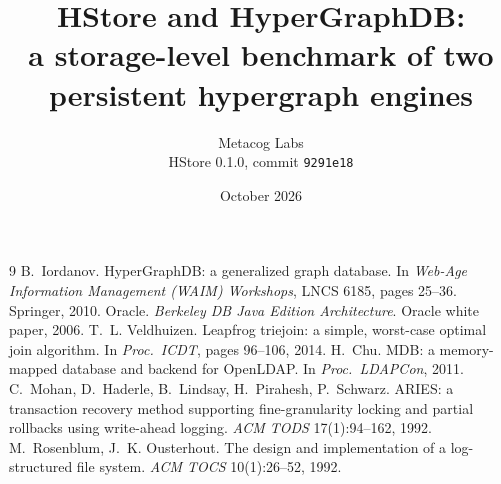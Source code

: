 \documentclass[10pt,twocolumn]{article}
\title{\Large\bfseries HStore and HyperGraphDB:\\ a storage-level benchmark of two persistent hypergraph engines}
\author{Metacog Labs\\[2pt]\normalsize HStore 0.1.0, commit \texttt{9291e18}}
\date{October 2026}
\begin{document}
\maketitle

\begin{abstract}

\end{abstract}










\begin{thebibliography}{9}\small
{} B.~Iordanov. HyperGraphDB: a generalized graph database. In \emph{Web-Age Information Management (WAIM) Workshops}, LNCS 6185, pages 25--36. Springer, 2010.
 Oracle. \emph{Berkeley DB Java Edition Architecture}. Oracle white paper, 2006.
 T.~L. Veldhuizen. Leapfrog triejoin: a simple, worst-case optimal join algorithm. In \emph{Proc.\ ICDT}, pages 96--106, 2014.
 H.~Chu. MDB: a memory-mapped database and backend for OpenLDAP. In \emph{Proc.\ LDAPCon}, 2011.
 C.~Mohan, D.~Haderle, B.~Lindsay, H.~Pirahesh, P.~Schwarz. ARIES: a transaction recovery method supporting fine-granularity locking and partial rollbacks using write-ahead logging. \emph{ACM TODS} 17(1):94--162, 1992.
 M.~Rosenblum, J.~K. Ousterhout. The design and implementation of a log-structured file system. \emph{ACM TOCS} 10(1):26--52, 1992.
\end{thebibliography}

\clearpage
\onecolumn
\appendix

\end{document}

